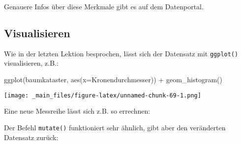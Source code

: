 \documentclass[
  ngerman,
]{article}
\newenvironment{Shaded}{\begin{snugshade}}{\end{snugshade}}
\newcommand{\AttributeTok}[1]{\textcolor[rgb]{0.77,0.63,0.00}{#1}}
\newcommand{\DecValTok}[1]{\textcolor[rgb]{0.00,0.00,0.81}{#1}}
\newcommand{\DocumentationTok}[1]{\textcolor[rgb]{0.56,0.35,0.01}{\textbf{\textit{#1}}}}
\newcommand{\FunctionTok}[1]{\textcolor[rgb]{0.00,0.00,0.00}{#1}}
\newcommand{\NormalTok}[1]{#1}
\newcommand{\OtherTok}[1]{\textcolor[rgb]{0.56,0.35,0.01}{#1}}
\newcommand{\SpecialCharTok}[1]{\textcolor[rgb]{0.00,0.00,0.00}{#1}}
\begin{document}
Genauere Infos über diese Merkmale gibt es auf dem Datenportal.

\hypertarget{visualisieren}{%
\subsection{Visualisieren}\label{visualisieren}}

Wie in der letzten Lektion besprochen, lässt sich der Datensatz mit \texttt{ggplot()} visualisieren, z.B.:

\begin{Shaded}
\begin{Highlighting}[]
\FunctionTok{ggplot}\NormalTok{(baumkataster, }\FunctionTok{aes}\NormalTok{(}\AttributeTok{x=}\NormalTok{Kronendurchmesser)) }\SpecialCharTok{+}
  \FunctionTok{geom\_histogram}\NormalTok{()}
\end{Highlighting}
\end{Shaded}

\texttt{[image: \_main\_files/figure-latex/unnamed-chunk-69-1.png]}

Eine neue Messreihe lässt sich z.B. so errechnen:

\begin{Shaded}
\end{Shaded}

Der Befehl \texttt{mutate()} funktioniert sehr ähnlich, gibt aber den veränderten Datensatz zurück:
\end{document}
